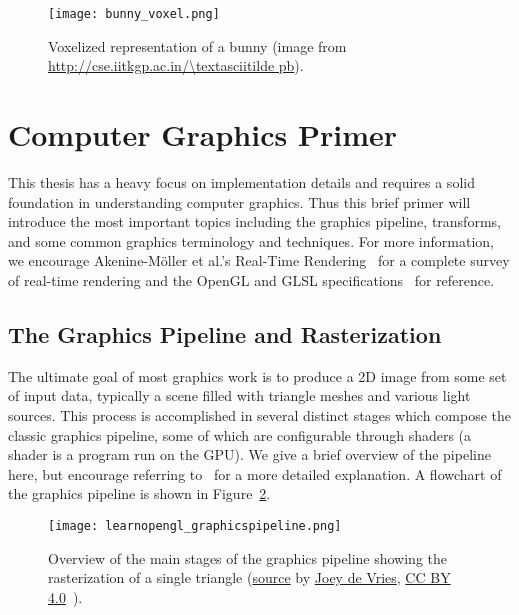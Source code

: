 
\begin{figure}[h]
\centering
\texttt{[image: bunny\_voxel.png]}
\caption{Voxelized representation of a bunny (image from \url{http://cse.iitkgp.ac.in/\textasciitilde pb}).}
\label{fig:bunnyvoxel}
\end{figure}

\section{Computer Graphics Primer}
This thesis has a heavy focus on implementation details and requires a solid foundation in understanding computer graphics. Thus this brief primer will introduce the most important topics including the graphics pipeline, transforms, and some common graphics terminology and techniques. For more information, we encourage Akenine-M{\"o}ller et al.'s Real-Time Rendering~\cite{moller2008rtr} for a complete survey of real-time rendering and the OpenGL and GLSL specifications~\cite{opengl45spec,glsl45spec} for reference.

\subsection{The Graphics Pipeline and Rasterization}
The ultimate goal of most graphics work is to produce a 2D image from some set of input data, typically a scene filled with triangle meshes and various light sources. This process is accomplished in several distinct stages which compose the classic graphics pipeline, some of which are configurable through shaders (a shader is a program run on the GPU). We give a brief overview of the pipeline here, but encourage referring to~\cite{moller2008rtr} for a more detailed explanation. A flowchart of the graphics pipeline is shown in Figure~\ref{fig:pipeline}.

\begin{figure}[h]
\centering
\texttt{[image: learnopengl\_graphicspipeline.png]}
\caption{Overview of the main stages of the graphics pipeline showing the rasterization of a single triangle (\href{https://learnopengl.com/img/getting-started/pipeline.png}{source} by \href{https://twitter.com/JoeyDeVriez}{Joey de Vries}, \href{https://creativecommons.org/licenses/by/4.0/}{CC BY 4.0}~\cite{learnopengl}).}
\label{fig:pipeline}
\end{figure}

